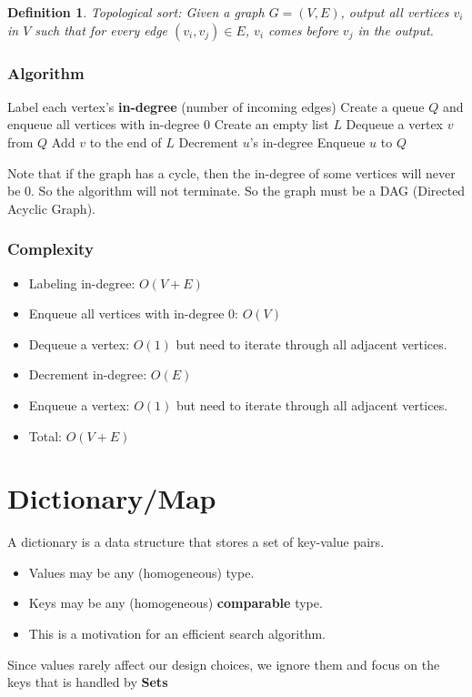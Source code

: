 \documentclass[letterpaper,12pt]{article}
\newtheorem{definition}{Definition}
\begin{document}
\begin{definition}
    Topological sort: Given a graph $G=(V,E)$, output all vertices $v_i$ in $V$ such that for every edge $(v_i, v_j) \in E$, $v_i$ comes before $v_j$ in the output.
\end{definition}

\subsubsection{Algorithm}

\begin{algorithmic}
        \State Label each vertex's \textbf{in-degree} (number of incoming edges)
        \State Create a queue $Q$ and enqueue all vertices with in-degree 0
        \State Create an empty list $L$
            \State Dequeue a vertex $v$ from $Q$
            \State Add $v$ to the end of $L$
                \State Decrement $u$'s in-degree
                    \State Enqueue $u$ to $Q$
                \EndIf
            \EndFor
        \EndWhile
    \EndFunction
\end{algorithmic}
Note that if the graph has a cycle, then the in-degree of some vertices will never be 0. So the algorithm will not terminate. So the graph must be a DAG (Directed Acyclic Graph).
\subsubsection{Complexity}
\begin{itemize}
    \item Labeling in-degree: $O(V+E)$
    \item Enqueue all vertices with in-degree 0: $O(V)$
    \item Dequeue a vertex: $O(1)$ but need to iterate through all adjacent vertices.
    \item Decrement in-degree: $O(E)$
    \item Enqueue a vertex: $O(1)$ but need to iterate through all adjacent vertices.
    \item Total: $O(V+E)$
\end{itemize}

\section{Dictionary/Map}
A dictionary is a data structure that stores a set of key-value pairs. \begin{itemize}
    \item Values may be any (homogeneous) type.
    \item Keys may be any (homogeneous) \textbf{comparable} type.
    \item This is a motivation for an efficient search algorithm.
\end{itemize}
Since values rarely affect our design choices, we ignore them and focus on the keys that is handled by \textbf{Sets}
\end{document}
